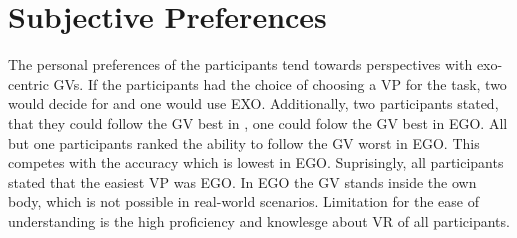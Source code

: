 \section{Subjective Preferences}
The personal preferences of the participants tend towards perspectives with exo-centric GVs. If the participants had the choice of choosing a VP for the task, two would decide for \combi and one would use EXO. Additionally, two participants stated, that they could follow the GV best in \combi, one could folow the GV best in EGO. All but one participants ranked the ability to follow the GV worst in EGO. This competes with the accuracy which is lowest in EGO. Suprisingly, all participants stated that the easiest VP was EGO. In EGO the GV stands inside the own body, which is not possible in real-world scenarios. Limitation for the ease of understanding is the high proficiency and knowlesge about VR of all participants.
